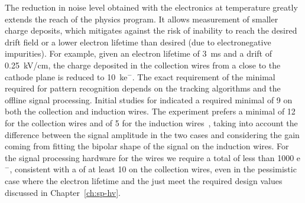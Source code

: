 The reduction in noise level obtained with the  electronics at  temperature greatly 
extends the reach of the  physics program. %
It allows measurement of smaller charge deposits, which mitigates against the risk of %
inability to reach the desired drift field %
or %
a lower electron lifetime %
than desired (due to %
electronegative impurities). %
For example, given an electron lifetime of \SI{3}{ms} and a drift \efield
of \SI{0.25}{kV/cm}, the charge deposited in the collection wires from a 
 close to the cathode plane is reduced to \SI{10}{k}{e$^-$}.
The exact requirement of the minimal  required for pattern
recognition depends on the tracking algorithms and %
the offline signal processing.
Initial studies for  indicated %
a required minimal  of \num{9} 
on both the collection and induction wires. %
The 
 experiment prefers a minimal  of \num{12} for the
collection wires and of \num{5} for the induction wires~\cite{bib:sbnddoc1921}, taking into account
the difference between the signal amplitude in the two cases and considering %
the gain coming from fitting the bipolar shape of the signal on the
induction wires. 
For the signal processing hardware for the  wires we require 
a total  of less than 1000 e$^-$, consistent with a 
of at least 10 on the collection wires, 
even in the pessimistic case  where the electron lifetime and the \efield just meet the required design values discussed in Chapter~\ref{ch:sp-hv}.

